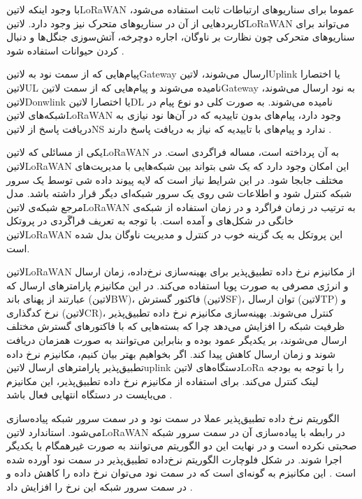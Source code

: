 با وجود اینکه ‌لاتین{LoRaWAN} عموما برای سناریوهای ارتباطات ثابت استفاده می‌شود، کاربردهایی از آن در سناریوهای متحرک نیز وجود دارد.
‌لاتین{LoRaWAN} می‌تواند برای سناریوهای متحرکی چون نظارت بر ناوگان، اجاره دوچرخه، آتش‌سوزی جنگل‌ها و دنبال کردن حیوانات
استفاده شود .

پیام‌هایی که از سمت نود به ‌لاتین{Gateway} ارسال می‌شوند، ‌لاتین{Uplink} یا اختصارا ‌لاتین{UL} نامیده می‌شوند و
پیام‌هایی که از سمت ‌لاتین{Gateway} به نود ارسال می‌شوند، ‌لاتین{Donwlink} یا اختصارا ‌لاتین{DL} نامیده می‌شوند.
به صورت کلی دو نوع پیام در شبکه‌های ‌لاتین{LoRaWAN} وجود دارد، پیام‌های بدون تاییدیه که در آن‌ها نود نیازی به دریافت پاسخ
از ‌لاتین{NS} ندارد و پیام‌های با تاییدیه که نیاز به دریافت پاسخ دارند
.

یکی از مسائلی که ‌لاتین{LoRaWAN} به آن پرداخته است، مساله فراگردی است. در ‌لاتین{LoRaWAN} این امکان وجود دارد
که یک شی بتواند بین شبکه‌هایی با مدیریت‌های مختلف جابجا شود. در این شرایط نیاز است که لایه پیوند داده شی توسط یک
سرور شبکه کنترل شود و اطلاعات شی روی یک سرور شبکه‌ای دیگر قرار داشته باشد. مدل مرجع شبکه‌ی ‌لاتین{LoRaWAN}
به ترتیب در زمان فراگرد و در زمان استفاده از شبکه‌ی خانگی در شکل‌های 
و  آمده است.
با توجه به تعریف فراگَردی در پروتکل ‌لاتین{LoRaWAN} این پروتکل به یک گزینه خوب در کنترل و مدیریت ناوگان بدل شده است.


‌لاتین{LoRaWAN} از مکانیزم نرخ داده تطبیق‌پذیر برای بهینه‌سازی نرخ‌داده، زمان ارسال و انرژی مصرفی به صورت پویا استفاده می‌کند.
در این مکانیزم پارامترهای ارسال که عبارتند از پهنای باند (‌لاتین{BW})، فاکتور گسترش (‌لاتین{SF})،
توان ارسال (‌لاتین{TP}) و نرخ کدگذاری (‌لاتین{CR})، کنترل می‌شوند.
بهینه‌سازی مکانیزم نرخ داده تطبیق‌پذیر ظرفیت شبکه را افزایش می‌دهد چرا که بسته‌هایی که با فاکتورهای گسترش مختلف ارسال می‌شوند،
بر یکدیگر عمود بوده و بنابراین می‌توانند به صورت همزمان دریافت شوند و زمان ارسال کاهش پیدا کند.
اگر بخواهیم بهتر بیان کنیم، مکانیزم نرخ داده تطبیق‌پذیر پارامترهای ارسال ‌لاتین{uplink} دستگاه‌های ‌لاتین{LoRa}
را با توجه به بودجه لینک کنترل می‌کند. برای استفاده از مکانیزم نرخ داده تطبیق‌پذیر، این مکانیزم می‌بایست در دستگاه انتهایی فعال باشد
.

الگوریتم نرخ داده تطبیق‌پذیر عملا در سمت نود و در سمت سرور شبکه پیاده‌سازی می‌شود. استاندارد ‌لاتین{LoRaWAN}
در رابطه با پیاده‌سازی آن در سمت سرور شبکه صحبتی نکرده است و در نهایت این دو الگوریتم می‌توانند به صورت غیرهمگام با یکدیگر
اجرا شوند. در شکل  فلوچارت الگوریتم نرخ‌داده تطبیق‌پذیر
در سمت نود آورده شده است
.
این مکانیزم به گونه‌ای است که در سمت نود می‌توان نرخ داده را کاهش داده و در سمت سرور شبکه این نرخ را افزایش داد
.

